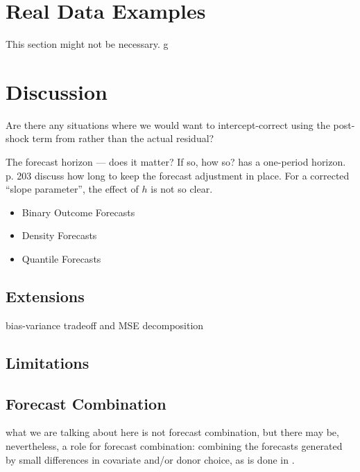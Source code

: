 \documentclass[11pt]{article}
\theoremstyle{definition}
\begin{document}
\section{Real Data Examples}
This section might not be necessary.
g\section{Discussion}

Are there any situations where we would want to intercept-correct using the post-shock term from \cite{lin2021minimizing} rather than the actual residual?

The forecast horizon --- does it matter?  If so, how so?  \cite{lin2021minimizing} has a one-period horizon.  \cite{clements1998forecasting}{p. 203} discuss how long to keep the forecast adjustment in place.  For a corrected ``slope parameter'', the effect of $h$ is not so clear.\\

\begin{itemize}
  \item Binary Outcome Forecasts
  \item Density Forecasts
  \item Quantile Forecasts
\end{itemize}

\subsection{Extensions}\label{Extensions}
bias-variance tradeoff and MSE decomposition\\

\subsection{Limitations}\label{Limitations}

\subsection{Forecast Combination}
what we are talking about here is not forecast combination, but there may be, nevertheless, a role for forecast combination: combining the forecasts generated by small differences in covariate and/or donor choice, as is done in \cite{lundquist2024volatility}. \\

\clearpage



 
\end{document}
